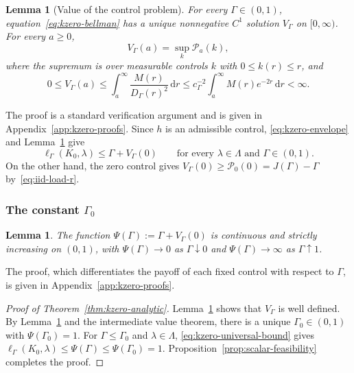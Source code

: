\documentclass[11pt]{article}
\newtheorem{lemma}[theorem]{Lemma}
\theoremstyle{definition}
\theoremstyle{remark}
\newcommand{\dd}{\,\mathrm d}
\begin{document}
\begin{lemma}[Value of the control problem]\label{lem:kzero-bellman}
For every $\Gamma\in(0,1)$, equation~\eqref{eq:kzero-bellman} has a unique nonnegative $C^1$ solution $V_\Gamma$ on $[0,\infty)$.
For every $a\ge0$,
\begin{equation}\label{eq:kzero-control-value}
 V_\Gamma(a)=\sup_k\mathcal P_a(k),
\end{equation}
where the supremum is over measurable controls $k$ with $0\le k(r)\le r$, and
\begin{equation}\label{eq:kzero-tail-majorant}
 0\le V_\Gamma(a)
 \le\int_a^\infty\frac{M(r)}{D_\Gamma(r)^2}\dd r
 \le c_\Gamma^{-2}\int_a^\infty M(r)e^{-2r}\dd r<\infty.
\end{equation}
\end{lemma}

The proof is a standard verification argument and is given in Appendix~\ref{app:kzero-proofs}.
Since $h$ is an admissible control, \eqref{eq:kzero-envelope} and Lemma~\ref{lem:kzero-bellman} give
\begin{equation}\label{eq:kzero-universal-bound}
 \ell_\Gamma(K_0,\lambda)\le\Gamma+V_\Gamma(0)
 \qquad\text{for every }\lambda\in\Lambda\text{ and }\Gamma\in(0,1).
\end{equation}
On the other hand, the zero control gives $V_\Gamma(0)\ge\mathcal P_0(0)=J(\Gamma)-\Gamma$ by~\eqref{eq:iid-load-r}.

\subsubsection{The constant \texorpdfstring{$\Gamma_0$}{Gamma0}}\label{sec:kzero-constant}

\begin{lemma}\label{lem:kzero-root}
The function $\Psi(\Gamma):=\Gamma+V_\Gamma(0)$ is continuous and strictly increasing on $(0,1)$, with $\Psi(\Gamma)\to0$ as $\Gamma\downarrow0$ and $\Psi(\Gamma)\to\infty$ as $\Gamma\uparrow1$.
\end{lemma}

The proof, which differentiates the payoff of each fixed control with respect to $\Gamma$, is given in Appendix~\ref{app:kzero-proofs}.

\begin{proof}[Proof of Theorem~\ref{thm:kzero-analytic}]
Lemma~\ref{lem:kzero-bellman} shows that $V_\Gamma$ is well defined.
By Lemma~\ref{lem:kzero-root} and the intermediate value theorem, there is a unique $\Gamma_0\in(0,1)$ with $\Psi(\Gamma_0)=1$.
For $\Gamma\le\Gamma_0$ and $\lambda\in\Lambda$, \eqref{eq:kzero-universal-bound} gives $\ell_\Gamma(K_0,\lambda)\le\Psi(\Gamma)\le\Psi(\Gamma_0)=1$.
Proposition~\ref{prop:scalar-feasibility} completes the proof.
\end{proof}
\end{document}
